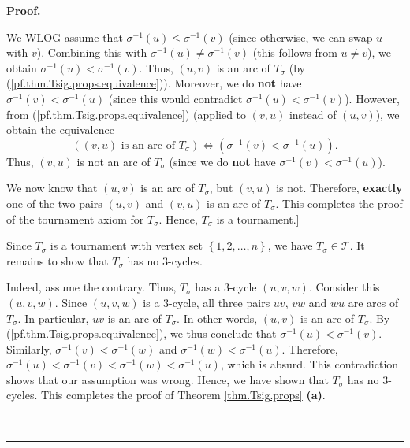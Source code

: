 \documentclass[numbers=enddot,12pt,final,onecolumn,notitlepage]{scrartcl}%
\numberwithin{exer}{subsection}
\theoremstyle{definition}
\newenvironment{fineprint}{\begin{small}}{\end{small}}
\newenvironment{proof}[1][Proof]{\noindent\textbf{#1.} }{\ \rule{0.5em}{0.5em}}
\begin{document}
\begin{proof}
\begin{fineprint}
We WLOG assume that $\sigma^{-1}\left(  u\right)  \leq\sigma^{-1}\left(
v\right)  $ (since otherwise, we can swap $u$ with $v$). Combining this with
$\sigma^{-1}\left(  u\right)  \neq\sigma^{-1}\left(  v\right)  $ (this follows
from $u\neq v$), we obtain $\sigma^{-1}\left(  u\right)  <\sigma^{-1}\left(
v\right)  $. Thus, $\left(  u,v\right)  $ is an arc of $T_{\sigma}$ (by
(\ref{pf.thm.Tsig.props.equivalence})). Moreover, we do \textbf{not} have
$\sigma^{-1}\left(  v\right)  <\sigma^{-1}\left(  u\right)  $ (since this
would contradict $\sigma^{-1}\left(  u\right)  <\sigma^{-1}\left(  v\right)
$). However, from (\ref{pf.thm.Tsig.props.equivalence}) (applied to $\left(
v,u\right)  $ instead of $\left(  u,v\right)  $), we obtain the equivalence%
\[
\left(  \left(  v,u\right)  \text{ is an arc of }T_{\sigma}\right)
\Longleftrightarrow\left(  \sigma^{-1}\left(  v\right)  <\sigma^{-1}\left(
u\right)  \right)  .
\]
Thus, $\left(  v,u\right)  $ is not an arc of $T_{\sigma}$ (since we do
\textbf{not} have $\sigma^{-1}\left(  v\right)  <\sigma^{-1}\left(  u\right)
$).

We now know that $\left(  u,v\right)  $ is an arc of $T_{\sigma}$, but
$\left(  v,u\right)  $ is not. Therefore, \textbf{exactly} one of the two
pairs $\left(  u,v\right)  $ and $\left(  v,u\right)  $ is an arc of
$T_{\sigma}$. This completes the proof of the tournament axiom for $T_{\sigma
}$. Hence, $T_{\sigma}$ is a tournament.] \medskip
\end{fineprint}

Since $T_{\sigma}$ is a tournament with vertex set $\left\{  1,2,\ldots
,n\right\}  $, we have $T_{\sigma}\in\mathcal{T}$. It remains to show that
$T_{\sigma}$ has no $3$-cycles.

Indeed, assume the contrary. Thus, $T_{\sigma}$ has a $3$-cycle $\left(
u,v,w\right)  $. Consider this $\left(  u,v,w\right)  $. Since $\left(
u,v,w\right)  $ is a $3$-cycle, all three pairs $uv$, $vw$ and $wu$ are arcs
of $T_{\sigma}$. In particular, $uv$ is an arc of $T_{\sigma}$. In other
words, $\left(  u,v\right)  $ is an arc of $T_{\sigma}$. By
(\ref{pf.thm.Tsig.props.equivalence}), we thus conclude that $\sigma
^{-1}\left(  u\right)  <\sigma^{-1}\left(  v\right)  $. Similarly,
$\sigma^{-1}\left(  v\right)  <\sigma^{-1}\left(  w\right)  $ and $\sigma
^{-1}\left(  w\right)  <\sigma^{-1}\left(  u\right)  $. Therefore,
$\sigma^{-1}\left(  u\right)  <\sigma^{-1}\left(  v\right)  <\sigma
^{-1}\left(  w\right)  <\sigma^{-1}\left(  u\right)  $, which is absurd. This
contradiction shows that our assumption was wrong. Hence, we have shown that
$T_{\sigma}$ has no $3$-cycles. This completes the proof of Theorem
\ref{thm.Tsig.props} \textbf{(a)}. \medskip


\end{proof}
\end{document}

